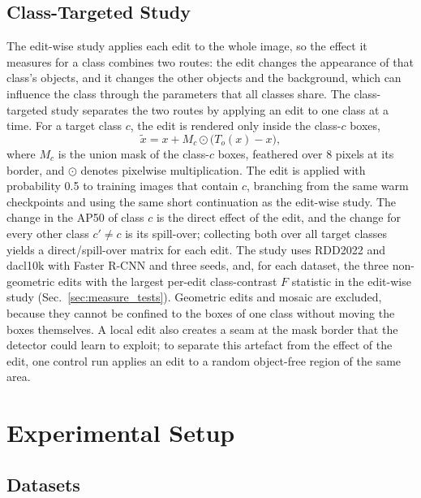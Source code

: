 \documentclass[conference]{IEEEtran}
\begin{document}
\subsection{Class-Targeted Study}
\label{sec:measure_targeted}

The edit-wise study applies each edit to the whole image, so the effect it measures for a class combines two routes: the edit changes the appearance of that class's objects, and it changes the other objects and the background, which can influence the class through the parameters that all classes share. The class-targeted study separates the two routes by applying an edit to one class at a time. For a target class $c$, the edit is rendered only inside the class-$c$ boxes,
\begin{equation}
\tilde x=x+M_c\odot\bigl(T_o(x)-x\bigr),
\label{eq:targeted}
\end{equation}
where $M_c$ is the union mask of the class-$c$ boxes, feathered over 8 pixels at its border, and $\odot$ denotes pixelwise multiplication. The edit is applied with probability 0.5 to training images that contain $c$, branching from the same warm checkpoints and using the same short continuation as the edit-wise study. The change in the AP50 of class $c$ is the direct effect of the edit, and the change for every other class $c'\neq c$ is its spill-over; collecting both over all target classes yields a direct/spill-over matrix for each edit. The study uses RDD2022 and dacl10k with Faster R-CNN and three seeds, and, for each dataset, the three non-geometric edits with the largest per-edit class-contrast $F$ statistic in the edit-wise study (Sec.~\ref{sec:measure_tests}). Geometric edits and mosaic are excluded, because they cannot be confined to the boxes of one class without moving the boxes themselves. A local edit also creates a seam at the mask border that the detector could learn to exploit; to separate this artefact from the effect of the edit, one control run applies an edit to a random object-free region of the same area.

\section{Experimental Setup}
\label{sec:setup}

\subsection{Datasets}
\label{sec:setup_data}
\end{document}
